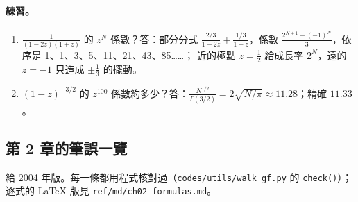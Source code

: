 \paragraph{練習。}
\begin{enumerate}
\item $\frac1{(1-2z)(1+z)}$ 的 $z^N$ 係數？\quad 答：部分分式 $\frac{2/3}{1-2z}+\frac{1/3}{1+z}$，係數 $\frac{2^{N+1}+(-1)^N}3$，依序是 1、1、3、5、11、21、43、85……；
近的極點 $z=\frac12$ 給成長率 $2^N$，遠的 $z=-1$ 只造成 $\pm\frac13$ 的擺動。
\item $(1-z)^{-3/2}$ 的 $z^{100}$ 係數約多少？\quad 答：$\frac{N^{1/2}}{\Gamma(3/2)}=2\sqrt{N/\pi}\approx11.28$；精確 $11.33$。
\end{enumerate}

\subsection{第 2 章的筆誤一覽}
給 2004 年版。每一條都用程式核對過（\texttt{codes/utils/walk\_gf.py} 的 \texttt{check()}）；逐式的 LaTeX 版見 \texttt{ref/md/ch02\_formulas.md}。
\begin{center}
\small
\TwoTabErrata
\end{center}

